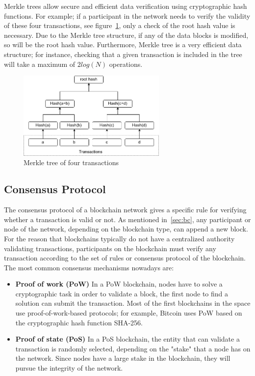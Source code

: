 \documentclass[11pt,a4paper]{report}
\begin{document}
Merkle trees allow secure and efficient data verification using cryptographic hash functions. For example; if a participant in the network needs to verify the validity of these four transactions, see figure~\ref{fig:merkle}, only a check of the root hash value is necessary. Due to the Merkle tree structure, if any of the data blocks is modified, so will be the root hash value. Furthermore, Merkle tree is a very efficient data structure; for instance, checking that a given transaction is included in the tree will take a maximum of $2log (N)$ operations.
\begin{figure}[htp]
	\centering
	\includegraphics[width=0.65\textwidth]{./images/merkle}
	\caption{Merkle tree of four transactions}
	\label{fig:merkle}
\end{figure}
\subsection{Consensus Protocol}\label{sec:cp}
The consensus protocol\cite{article:bc} of a blockchain network gives a specific rule for verifying whether a transaction is valid or not. As mentioned in~\ref{sec:bc}, any participant or node of the network, depending on the blockchain type, can append a new block. For the reason that blockchains typically do not have a centralized authority validating transactions, participants on the blockchain must verify any transaction according to the set of rules or consensus protocol of the blockchain. The most common consensus mechanisms nowadays are:
\begin{itemize}
	\item[] \textbf{Proof of work (PoW)}
	In a PoW blockchain, nodes have to solve a cryptographic task in order to validate a block, the first node to find a solution can submit the transaction. Most of the first blockchains in the space use proof-of-work-based protocols; for example, Bitcoin uses PoW based on the cryptographic hash function SHA-256.	
	\item[] \textbf{Proof of state (PoS)}
	In a PoS blockchain, the entity that can validate a transaction is randomly selected, depending on the "stake" that a node has on the network. Since nodes have a large stake in the blockchain, they will pursue the integrity of the network.

\end{itemize}
\end{document}
